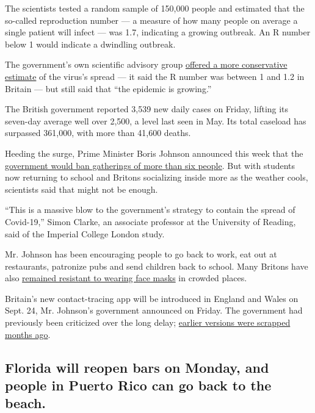 The scientists tested a random sample of 150,000 people and estimated
that the so-called reproduction number --- a measure of how many people
on average a single patient will infect --- was 1.7, indicating a
growing outbreak. An R number below 1 would indicate a dwindling
outbreak.

The government's own scientific advisory group
\href{https://www.gov.uk/guidance/the-r-number-in-the-uk}{offered a more
conservative estimate} of the virus's spread --- it said the R number
was between 1 and 1.2 in Britain --- but still said that ``the epidemic
is growing.''

The British government reported 3,539 new daily cases on Friday, lifting
its seven-day average well over 2,500, a level last seen in May. Its
total caseload has surpassed 361,000, with more than 41,600 deaths.

Heeding the surge, Prime Minister Boris Johnson announced this week that
the
\href{https://www.nytimes3xbfgragh.onion/2020/09/09/world/europe/boris-johnson-brexit-coronavirus.html}{government
would ban gatherings of more than six people}. But with students now
returning to school and Britons socializing inside more as the weather
cools, scientists said that might not be enough.

``This is a massive blow to the government's strategy to contain the
spread of Covid-19,'' Simon Clarke, an associate professor at the
University of Reading, said of the Imperial College London study.

Mr. Johnson has been encouraging people to go back to work, eat out at
restaurants, patronize pubs and send children back to school. Many
Britons have also
\href{https://www.nytimes3xbfgragh.onion/2020/07/14/world/europe/uk-coronavirus-masks-mandate.html}{remained
resistant to wearing face masks} in crowded places.

Britain's new contact-tracing app will be introduced in England and
Wales on Sept. 24, Mr. Johnson's government announced on Friday. The
government had previously been criticized over the long delay;
\href{https://www.nytimes3xbfgragh.onion/2020/06/17/world/europe/uk-contact-tracing-coronavirus.html}{earlier
versions were scrapped months ago}.

\hypertarget{florida-will-reopen-bars-on-monday-and-people-in-puerto-rico-can-go-back-to-the-beach}{%
\subsection{Florida will reopen bars on Monday, and people in Puerto
Rico can go back to the
beach.}\label{florida-will-reopen-bars-on-monday-and-people-in-puerto-rico-can-go-back-to-the-beach}}

